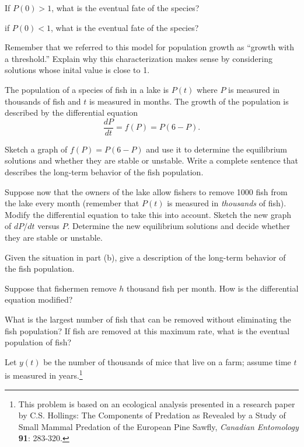\begin{exercises}
    \item  If $P(0)>1$, what is the eventual fate of the species?

    \item  if $P(0)<1$, what is the eventual fate of the species?

    \item  Remember that we referred to this model for population growth
    as ``growth with a threshold.''  Explain why this characterization makes sense by considering
    solutions whose inital value is close to 1.  
	\ea
	
  \item The population of a species of fish in a lake is $P(t)$ where
    $P$ is measured in thousands of fish and $t$ is measured in
    months.  The growth of the population is described by the
    differential equation
    $$
    \frac{dP}{dt} = f(P) = P(6-P).
    $$

   \ba
   \item  Sketch a graph of $f(P) = P(6-P)$ and use it to determine the
    equilibrium solutions and whether they are stable or unstable.
    Write a complete sentence that describes the long-term behavior of
    the fish population.

    \item Suppose now that the owners of the lake allow fishers to
    remove 1000 fish from the lake every month (remember that $P(t)$
    is measured in {\em thousands} of fish).  Modify the differential
    equation to take this into account.  Sketch the new graph of
    $dP/dt$ versus $P$.  Determine the new equilibrium solutions and
    decide whether they are stable or unstable.  

    \item  Given the situation in part (b), give a description of
    the long-term behavior of the fish population.

    \item  Suppose that fishermen remove $h$ thousand fish per month.  
    How is the differential equation modified?  

    \item  What is the largest
    number of fish that can be removed without eliminating the fish
    population?  If fish are removed at this maximum rate, what is the
    eventual population of fish?
    
    \ea

  \item Let $y(t)$ be the number of thousands of mice that live on a
    farm;  assume time $t$ is measured in years.\footnote{This problem is based on an ecological analysis
    presented in a research paper by C.S. Hollings:  The Components of
    Predation as Revealed by a Study of Small Mammal Predation of the
    European Pine Sawfly, {\em Canadian Entomology} {\bf 91}: 283-320.  }


\end{exercises}
